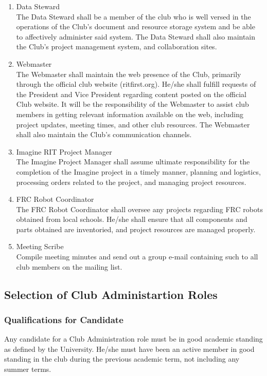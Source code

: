 \documentclass[english,11pt]{article}
\begin{document}
\begin{enumerate}[label=\Alph*.]
\item {\large Data Steward} \\
        The Data Steward shall be a member of the club who is well versed in the operations of the Club's document and resource storage system and be able to affectively administer said system.
        The Data Steward shall also maintain the Club's project management system, and collaboration sites.
\item {\large Webmaster} \\
        The Webmaster shall maintain the web presence of the Club, primarily through the official club website (ritfirst.org).
        He/she shall fulfill requests of the President and Vice President regarding content posted on the official Club website.
        It will be the responsibility of the Webmaster to assist club members in getting relevant information available on the web, including project updates, meeting times, and other club resources.
        The Webmaster shall also maintain the Club's communication channels.
\item {\large Imagine RIT Project Manager} \\
        The Imagine Project Manager shall assume ultimate responsibility for the completion of the Imagine project in a timely manner, planning and logistics, processing orders related to the project, and managing project resources.
\item {\large FRC Robot Coordinator} \\
        The FRC Robot Coordinator shall oversee any projects regarding FRC robots obtained from local schools. He/she shall ensure that all components and parts obtained are inventoried, and project resources are managed properly.
\item {\large Meeting Scribe} \\
        Compile meeting minutes and send out a group e-mail containing such to all club members on the mailing list.
\end{enumerate}

\subsection{Selection of Club Administartion Roles}
\subsubsection{Qualifications for Candidate}
Any candidate for a Club Administration role must be in good academic standing as defined by the University.
He/she must have been an active member in good standing in the club during the previous academic term, not including any summer terms.
\end{document}
